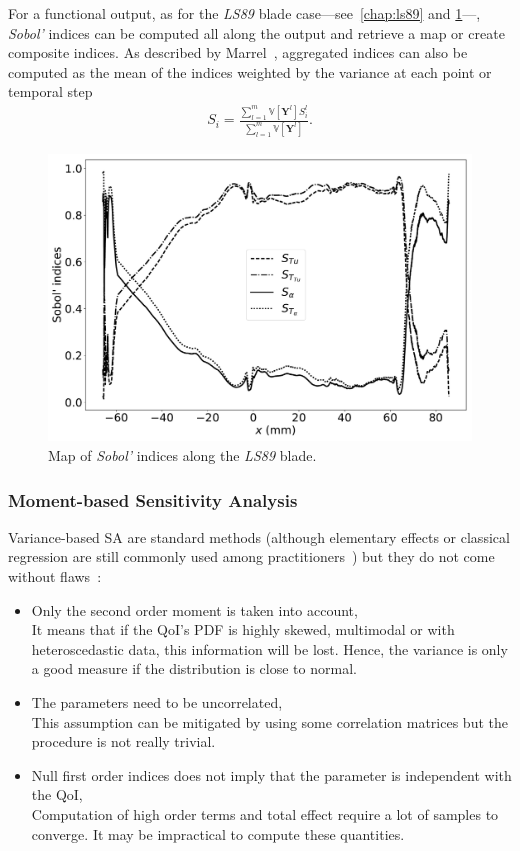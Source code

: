 For a functional output, as for the \textit{LS89} blade case---see~\cref{chap:ls89} and \cref{fig:map_sobol}---, \textit{Sobol'} indices can be computed all along the output and retrieve a map or create composite indices. As described by Marrel~\cite{marrel2015}, aggregated indices can also be computed as the mean of the indices weighted by the variance at each point or temporal step
\begin{align}
S_i = \frac{\displaystyle\sum_{l = 1}^{m} \mathbb{V} [\mathbf{Y}^l] S_i^{l}}{\displaystyle\sum_{l = 1}^{m} \mathbb{V} [\mathbf{Y}^l]}.
\end{align}

\begin{figure}[H]
\centering
\includegraphics[width=0.8\linewidth,keepaspectratio]{fig/literature/sobol_map.pdf}
\caption{Map of \emph{Sobol'} indices along the \textit{LS89} blade.}
\label{fig:map_sobol}
\end{figure}

\subsubsection{Moment-based Sensitivity Analysis}
Variance-based SA are standard methods (although elementary effects or classical regression are still commonly used among practitioners~\cite{ferretti2016}) but they do not come without flaws~\cite{borgonovo2016}:

\begin{itemize}
\item Only the second order moment is taken into account,\\
It means that if the QoI's PDF is highly skewed, multimodal or with heteroscedastic data, this information will be lost. Hence, the variance is only a good measure if the distribution is close to normal.
\item The parameters need to be uncorrelated,\\
This assumption can be mitigated by using some correlation matrices but the procedure is not really trivial.
\item Null first order indices does not imply that the parameter is independent with the QoI,\\
Computation of high order terms and total effect require a lot of samples to converge. It may be impractical to compute these quantities.
\end{itemize}

